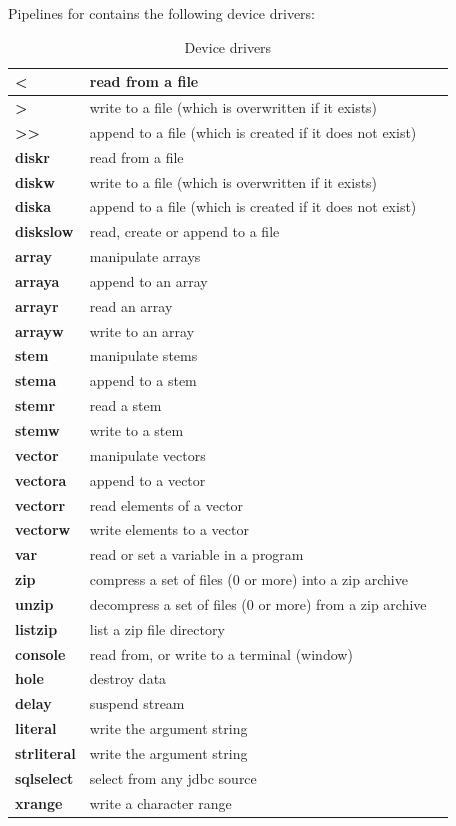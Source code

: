 Pipelines for \nr{} contains the following device drivers:

\begin{longtable}[l]{|l|p{10cm}|l|}
\caption{ Device drivers } \\
\hline
\textbf{<}&read from a file \\
\hline
\textbf{>}&write to a file (which is overwritten if it exists) \\
\hline
\textbf{>>}&append to a file (which is created if it does not exist) \\
\hline
\textbf{diskr}&read from a file \\
\hline
\textbf{diskw}&write to a file (which is overwritten if it exists) \\
\hline
\textbf{diska}&append to a file (which is created if it does not exist) \\
\hline
\textbf{diskslow}&read, create or append to a file \\
\hline
\textbf{array}&manipulate arrays \\
\hline
\textbf{arraya}&append to an array \\
\hline
\textbf{arrayr}&read an array \\
\hline
\textbf{arrayw}&write to an array \\
\hline
\textbf{stem}&manipulate stems \\
\hline
\textbf{stema}&append to a stem \\
\hline
\textbf{stemr}&read a stem \\
\hline
\textbf{stemw}&write to a stem \\
\hline
\textbf{vector}&manipulate vectors \\
\hline
\textbf{vectora}&append to a vector \\
\hline
\textbf{vectorr}&read elements of a vector \\
\hline
\textbf{vectorw}&write elements to a vector \\
\hline
\textbf{var}&read or set a variable in a \nr{} program \\
\hline
\textbf{zip}&compress a set of files (0 or more) into a zip archive \\
\hline
\textbf{unzip}&decompress a set of files (0 or more) from a zip archive \\
\hline
\textbf{listzip}&list a zip file directory \\
\hline
\textbf{console}& read from, or write to a terminal (window) \\
\hline
\textbf{hole}&destroy data \\
\hline
\textbf{delay}&suspend stream \\
\hline
\textbf{literal}&write the argument string \\
\hline
\textbf{strliteral}&write the argument string \\
\hline
\textbf{sqlselect}&select from any jdbc source \\
\hline
\textbf{xrange}&write a character range \\
\hline
\end{longtable}

